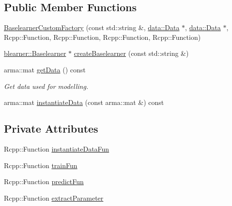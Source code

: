 \subsection*{Public Member Functions}
\begin{DoxyCompactItemize}
\item 
\hyperlink{classblearnerfactory_1_1_baselearner_custom_factory_a17a9ea35c905f9641f684db8928d3fa8}{Baselearner\+Custom\+Factory} (const std\+::string \&, \hyperlink{classdata_1_1_data}{data\+::\+Data} $\ast$, \hyperlink{classdata_1_1_data}{data\+::\+Data} $\ast$, Rcpp\+::\+Function, Rcpp\+::\+Function, Rcpp\+::\+Function, Rcpp\+::\+Function)
\item 
\hyperlink{classblearner_1_1_baselearner}{blearner\+::\+Baselearner} $\ast$ \hyperlink{classblearnerfactory_1_1_baselearner_custom_factory_a79a93fe73bd8f307bb888f76da39246d}{create\+Baselearner} (const std\+::string \&)
\item 
arma\+::mat \hyperlink{classblearnerfactory_1_1_baselearner_custom_factory_ae61c7af49c08d61b7714561bde1824d8}{get\+Data} () const
\begin{DoxyCompactList}\small\item\em Get data used for modelling. \end{DoxyCompactList}\item 
arma\+::mat \hyperlink{classblearnerfactory_1_1_baselearner_custom_factory_a82c10a256672d998a592181f85e05c81}{instantiate\+Data} (const arma\+::mat \&) const
\end{DoxyCompactItemize}
\subsection*{Private Attributes}
\begin{DoxyCompactItemize}
\item 
Rcpp\+::\+Function \hyperlink{classblearnerfactory_1_1_baselearner_custom_factory_ac6b82b006f9ac4dae60077b99282ec98}{instantiate\+Data\+Fun}
\item 
Rcpp\+::\+Function \hyperlink{classblearnerfactory_1_1_baselearner_custom_factory_ab0d94b2fe7c675252255f791eab3ad7a}{train\+Fun}
\item 
Rcpp\+::\+Function \hyperlink{classblearnerfactory_1_1_baselearner_custom_factory_ad7bed8ada05584d107edb2346f5d5a2b}{predict\+Fun}
\item 
Rcpp\+::\+Function \hyperlink{classblearnerfactory_1_1_baselearner_custom_factory_aa436eeac2ea759be578959cfcb892666}{extract\+Parameter}
\end{DoxyCompactItemize}
